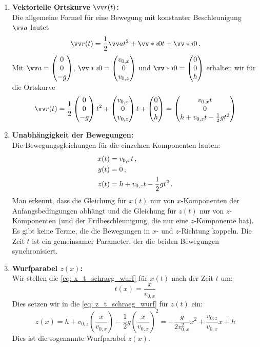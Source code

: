\documentclass[ngerman]{scrreprt}
\newenvironment{loesungbox}[1]
  {\needspace{5\baselineskip}\begin{loesungboxstyle}[frametitle={#1}]}
  {\end{loesungboxstyle}}
\begin{document}
\begin{loesungbox}{Lösung zu \Cref{aufg:schraeger_wurf}}
\begin{enumerate}
    \item \textbf{Vektorielle Ortskurve $\ivec{r}(t)$:} \\
    Die allgemeine Formel für eine Bewegung mit konstanter Beschleunigung $\ivec{a}$ lautet 
    $$\ivec{r}(t) = \frac{1}{2}\ivec{a}t^2 + \ivecS{v}{0}t + \ivecS{r}{0} \mDot$$
    Mit $\ivec{a} = \icolThree{0}{0}{-g}$, $\ivecS{v}{0} = \icolThree{v_{0,x}}{0}{v_{0,z}}$ und $\ivecS{r}{0} = \icolThree{0}{0}{h}$ erhalten wir für die Ortskurve 
    \begin{equation}\label{eq: wurf_r_t}
        \ivec{r}(t) = \frac{1}{2}\icolThree{0}{0}{-g}t^2 + \icolThree{v_{0,x}}{0}{v_{0,z}}t + \icolThree{0}{0}{h} = \icolThree{v_{0,x}t}{0}{h + v_{0,z}t - \frac{1}{2}gt^2}
    \end{equation}
    
    \item \textbf{Unabhängigkeit der Bewegungen:} \\
    Die Bewegungsgleichungen für die einzelnen Komponenten lauten:
    \begin{align}
        x(t) &= v_{0,x}t \,{,}\, \label{eq: x_t_schraeg_wurf}\\
        y(t) &= 0 \,{,}\,  \nonumber\\
        z(t) &= h + v_{0,z}t - \frac{1}{2}gt^2 \,. \label{eq: z_t_schraeg_wurf}
    \end{align}
    Man erkennt, dass die Gleichung für $x(t)$ nur von $x$-Komponenten der Anfangsbedingungen abhängt und die Gleichung für $z(t)$ nur von $z$-Komponenten (und der Erdbeschleunigung, die nur eine $z$-Komponente hat). Es gibt keine Terme, die die Bewegungen in $x$- und $z$-Richtung koppeln. Die Zeit $t$ ist ein gemeinsamer Parameter, der die beiden Bewegungen synchronisiert.
    
    \item \textbf{Wurfparabel $z(x)$:} \\
    Wir stellen die \cref{eq: x_t_schraeg_wurf} für $x(t)$ nach der Zeit $t$ um:
    \begin{equation}
        t(x) = \frac{x}{v_{0,x}} \label{eq: t_von_x}
    \end{equation}
    Dies setzen wir in die \cref{eq: z_t_schraeg_wurf} für $z(t)$ ein: 
    \begin{equation}\label{eq: wurfparabel}
        z(x) = h + v_{0,z}\left(\frac{x}{v_{0,x}}\right) - \frac{1}{2}g\left(\frac{x}{v_{0,x}}\right)^2 = -\frac{g}{2v_{0,x}^2}x^2 + \frac{v_{0,z}}{v_{0,x}}x + h
    \end{equation}
    Dies ist die sogenannte Wurfparabel $z(x)$. 
    

\end{enumerate}
\end{loesungbox}
\end{document}
